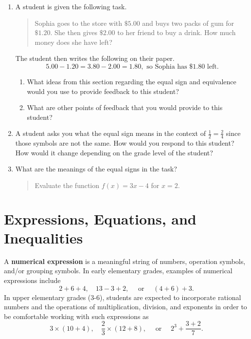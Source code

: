 \documentclass[
]{book}
\let\stdsection\section
\renewcommand\section{\newpage\stdsection}
\theoremstyle{definition}
\theoremstyle{definition}
\theoremstyle{definition}
\theoremstyle{definition}
\theoremstyle{remark}
\begin{document}
\begin{enumerate}
\def\labelenumi{\arabic{enumi}.}
\item
  A student is given the following task.

  \begin{quote}
  Sophia goes to the store with \(\$5.00\) and buys two packs of gum for \(\$1.20\). She then gives \(\$2.00\) to her friend to buy a drink. How much money does she have left?
  \end{quote}

  The student then writes the following on their paper.
  \[5.00-1.20=3.80-2.00=1.80, \mbox{ so Sophia has } \$1.80 \mbox{ left.}\]

  \begin{enumerate}
  \def\labelenumii{\alph{enumii}.}
  \item
    What ideas from this section regarding the equal sign and equivalence would you use to provide feedback to this student?
  \item
    What are other points of feedback that you would provide to this student?
  \end{enumerate}
\item
  A student asks you what the equal sign means in the context of \(\frac{1}{2}=\frac{2}{4}\) since those symbols are not the same. How would you respond to this student? How would it change depending on the grade level of the student?
\item
  What are the meanings of the equal signs in the task?

  \begin{quote}
  Evaluate the function \(f(x)=3x-4\) for \(x=2\).
  \end{quote}
\end{enumerate}

\hypertarget{expressions-equations-and-inequalities}{%
\section{Expressions, Equations, and Inequalities}\label{expressions-equations-and-inequalities}}

A \textbf{numerical expression} is a meaningful string of numbers, operation symbols, and/or grouping symbols. In early elementary grades, examples of numerical expressions include \[2+6+4, \quad 13-3+2, \quad \mbox{ or } \quad (4+6)+3.\] In upper elementary grades (3-6), students are expected to incorporate rational numbers and the operations of multiplication, division, and exponents in order to be comfortable working with such expressions as
\[3 \times (10+4), \quad \frac{2}{3} \times (12+8), \quad \mbox{ or } \quad  2^3 + \frac{3+2}{7}.\]
\end{document}
